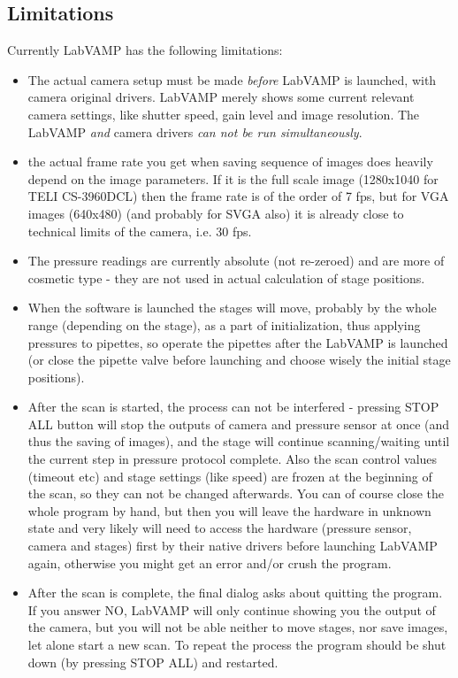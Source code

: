 \documentclass[a4paper,12pt]{article}
\begin{document}
\subsection{Limitations}\label{labvamp-limits}
Currently LabVAMP has the following limitations:
\begin{itemize}
	\item The actual camera setup must be made \emph{before} LabVAMP is launched, with camera original drivers. LabVAMP merely shows some current relevant camera settings, like shutter speed, gain level and image resolution. The LabVAMP \emph{and} camera drivers \emph{can not be run simultaneously}.
	\item the actual frame rate you get when saving sequence of images does heavily depend on the image parameters. If it is the full scale image (1280x1040 for TELI CS-3960DCL) then the frame rate is of the order of 7 fps, but for VGA images (640x480) (and probably for SVGA also) it is already close to technical limits of the camera, i.e. 30 fps.
	\item The pressure readings are currently absolute (not re-zeroed) and are more of cosmetic type - they are not used in actual calculation of stage positions.
	\item When the software is launched the stages will move, probably by the whole range (depending on the stage), as a part of initialization, thus applying pressures to pipettes, so operate the pipettes after the LabVAMP is launched (or close the pipette valve before launching and choose wisely the initial stage positions).
	\item After the scan is started, the process can not be interfered - pressing STOP ALL button will  stop the outputs of camera and pressure sensor at once (and thus the saving of images), and the stage will continue scanning/waiting until the current step in pressure protocol complete. Also the scan control values (timeout etc) and stage settings (like speed) are frozen at the beginning of the scan, so they can not be changed afterwards. You can of course close the whole program by hand, but then you will leave the hardware in unknown state and very likely will need to access the hardware (pressure sensor, camera and stages) first by their native drivers before launching LabVAMP again, otherwise you might get an error and/or crush the program.
	\item After the scan is complete, the final dialog asks about quitting the program. If you answer NO, LabVAMP will only continue showing you the output of the camera, but you will not be able neither to move stages, nor save images, let alone start a new scan. To repeat the process the program should be shut down (by pressing STOP ALL) and restarted.
\end{itemize}
\end{document}
